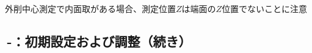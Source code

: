 \begin{marker}
外削中心測定\MXIface で内面取がある場合、測定位置$Z$は端面の$Z$位置でないことに注意
\end{marker}


\clearpage
\subsection{\,-：初期設定および調整（続き）}

